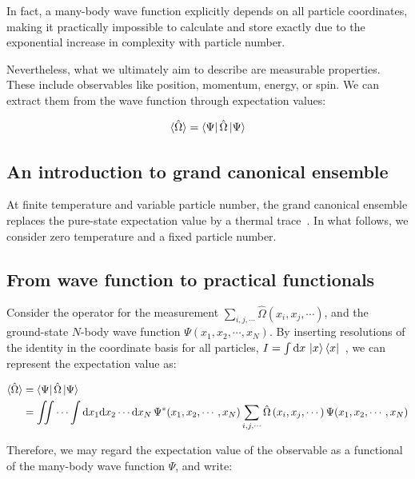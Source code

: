 In fact, a many-body wave function explicitly depends on all particle coordinates, making it practically impossible to calculate and store exactly due to the exponential increase in complexity with particle number.

Nevertheless, what we ultimately aim to describe are measurable properties.
These include observables like position, momentum, energy, or spin.
We can extract them from the wave function through expectation values:

\begin{equation}
    \braket{\hat{\Omega}} = \bra{\Psi}\hat{\Omega}\ket{\Psi}
\label{obvious}
\end{equation}

\FloatBarrier
\subsection{An introduction to grand canonical ensemble}

At finite temperature and variable particle number, the grand canonical ensemble replaces the pure-state expectation value by a thermal trace~\cite{gould2026ensemblization,pathria2022statistical}.
In what follows, we consider zero temperature and a fixed particle number.

\FloatBarrier
\subsection{From wave function to practical functionals}

Consider the operator for the measurement $\sum_{i,j,\cdots}\hat\Omega\left(x_i,x_j,\cdots\right)$,
and the ground-state $N$-body wave function $\Psi(x_1,x_2,\cdots,x_N)$.
By inserting resolutions of the identity in the coordinate basis for all particles, $I=\int \mathrm{d}x\,\ket{x}\bra{x}$~\cite{shankar2017quantum},
we can represent the expectation value as:

\begin{equation}
\begin{aligned}
    \braket{\hat\Omega} 
    &= \bra{\Psi}\hat\Omega\ket{\Psi} \\
    &= \iint\cdots\int \mathrm{d}x_1\mathrm{d}x_2\cdots\mathrm{d}x_N\,\Psi^*(x_1,x_2,\cdots,x_N)\sum_{i,j,\cdots}\hat\Omega\left(x_i,x_j,\cdots\right)\Psi(x_1,x_2,\cdots,x_N)
\end{aligned}
\label{observables_N-body}
\end{equation}

Therefore, we may regard the expectation value of the observable as a functional of the many-body wave function $\Psi$, and write:


